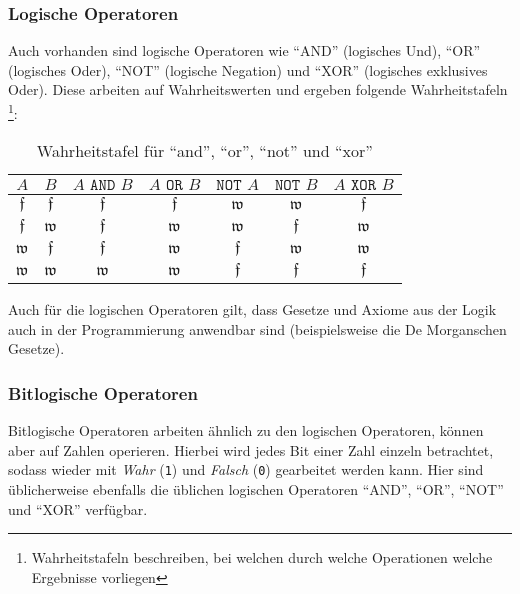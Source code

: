 	\subsubsection{Logische Operatoren}
		Auch vorhanden sind logische Operatoren wie \enquote{AND} (logisches Und), \enquote{OR} (logisches Oder), \enquote{NOT} (logische Negation) und \enquote{XOR} (logisches exklusives Oder). Diese arbeiten auf Wahrheitswerten und ergeben folgende Wahrheitstafeln \footnote{Wahrheitstafeln beschreiben, bei welchen durch welche Operationen welche Ergebnisse vorliegen}:
		\begin{table}[H]
			\centering
			\begin{tabular}{c c | c c c c c}
				$ A $ & $ B $ & $ A \texttt{ AND } B $ & $ A \texttt{ OR } B $ & $ \texttt{NOT } A $ & $ \texttt{NOT } B $ & $ A \texttt{ XOR } B $ \\
				\hline
				$ \mathfrak{f} $ & $ \mathfrak{f} $ & $ \mathfrak{f} $ & $ \mathfrak{f} $ & $ \mathfrak{w} $ & $ \mathfrak{w} $ & $ \mathfrak{f} $ \\
				$ \mathfrak{f} $ & $ \mathfrak{w} $ & $ \mathfrak{f} $ & $ \mathfrak{w} $ & $ \mathfrak{w} $ & $ \mathfrak{f} $ & $ \mathfrak{w} $ \\
				$ \mathfrak{w} $ & $ \mathfrak{f} $ & $ \mathfrak{f} $ & $ \mathfrak{w} $ & $ \mathfrak{f} $ & $ \mathfrak{w} $ & $ \mathfrak{w} $ \\
				$ \mathfrak{w} $ & $ \mathfrak{w} $ & $ \mathfrak{w} $ & $ \mathfrak{w} $ & $ \mathfrak{f} $ & $ \mathfrak{f} $ & $ \mathfrak{f} $ \\
			\end{tabular}
			\caption{Wahrheitstafel für \enquote{and}, \enquote{or}, \enquote{not} und \enquote{xor}}
		\end{table}
		
		
		Auch für die logischen Operatoren gilt, dass Gesetze und Axiome aus der Logik auch in der Programmierung anwendbar sind (beispielsweise die De Morganschen Gesetze).
	
	\subsubsection{Bitlogische Operatoren}
		Bitlogische Operatoren arbeiten ähnlich zu den logischen Operatoren, können aber auf Zahlen operieren. Hierbei wird jedes Bit einer Zahl einzeln betrachtet, sodass wieder mit \textit{Wahr} (\texttt{1}) und \textit{Falsch} (\texttt{0}) gearbeitet werden kann. Hier sind üblicherweise ebenfalls die üblichen logischen Operatoren \enquote{AND}, \enquote{OR}, \enquote{NOT} und \enquote{XOR} verfügbar.
		
